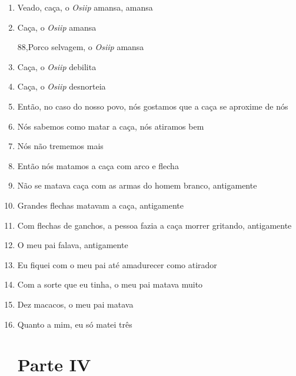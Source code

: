\begin{enumerate}
 \item Veado, caça, o \textit{Osiip} amansa, amansa

 \item Caça, o \textit{Osiip} amansa

 88,Porco selvagem, o \textit{Osiip} amansa

 \item Caça, o \textit{Osiip} debilita

 \item Caça, o \textit{Osiip} desnorteia

 \item Então, no caso do nosso povo, nós gostamos que a caça se aproxime de nós

 \begin{center}\end{center}

 \item Nós sabemos como matar a caça, nós atiramos bem

 \item Nós não trememos mais

 \item Então nós matamos a caça com arco e flecha

 \item Não se matava caça com as armas do homem branco, antigamente

 \item Grandes flechas matavam a caça, antigamente

 \item Com flechas de ganchos, a pessoa fazia a caça morrer gritando, antigamente

 \begin{center}\end{center}

 \item O meu pai falava, antigamente

 \item Eu fiquei com o meu pai até amadurecer como atirador

 \item Com a sorte que eu tinha, o meu pai matava muito

 \item Dez macacos, o meu pai matava

 \item Quanto a mim, eu só matei três

 \section{Parte IV}


\end{enumerate}
